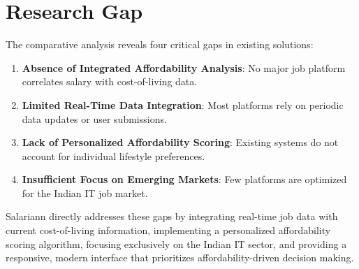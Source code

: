 \section{Research Gap}

The comparative analysis reveals four critical gaps in existing solutions:

\begin{enumerate}
    \item \textbf{Absence of Integrated Affordability Analysis}: No major job platform correlates salary with cost-of-living data.
    
    \item \textbf{Limited Real-Time Data Integration}: Most platforms rely on periodic data updates or user submissions.
    
    \item \textbf{Lack of Personalized Affordability Scoring}: Existing systems do not account for individual lifestyle preferences.
    
    \item \textbf{Insufficient Focus on Emerging Markets}: Few platforms are optimized for the Indian IT job market.
\end{enumerate}

Salariann directly addresses these gaps by integrating real-time job data with current cost-of-living information, implementing a personalized affordability scoring algorithm, focusing exclusively on the Indian IT sector, and providing a responsive, modern interface that prioritizes affordability-driven decision making.
